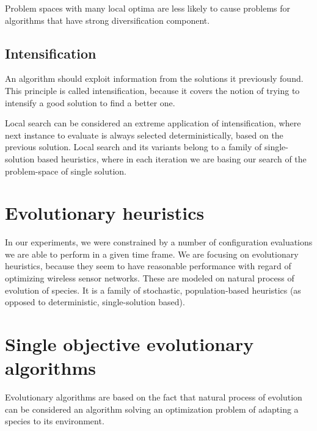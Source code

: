 \documentclass[12pt,oneside]{fithesis2}
\begin{document}
Problem spaces with many local optima are less likely to cause problems for algorithms that have strong diversification component.

\subsection{Intensification} 
An algorithm should exploit information from the solutions it previously found. This principle is called intensification, because it covers the notion of trying to intensify a good solution to find a better one.

Local search can be considered an extreme application of intensification, where next instance to evaluate is always selected deterministically, based on the previous solution. Local search and its variants belong to a family of single-solution based heuristics, where in each iteration we are basing our search of the problem-space of single solution.

\section{Evolutionary heuristics}

In our experiments, we were constrained by a number of configuration evaluations we are able to perform in a given time frame. 
We are focusing on evolutionary heuristics, because they seem to have reasonable performance with regard of optimizing wireless sensor networks.\cite{stehl2013opt}
These are modeled on natural process of evolution of species. It is a family of stochastic, population-based heuristics (as opposed to deterministic, single-solution based). 

\section{Single objective evolutionary algorithms}

Evolutionary algorithms are based on the fact that natural process of evolution can be considered an algorithm solving an optimization problem of adapting a species to its environment. 
\end{document}
